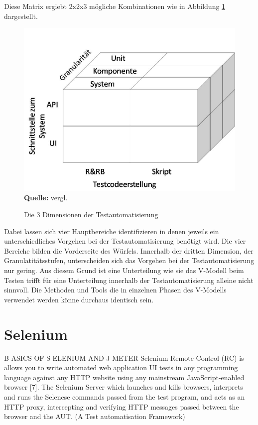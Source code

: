Diese Matrix ergiebt 2x2x3 mögliche Kombinationen wie in Abbildung \ref{fig:3DimensionenDerTestauto} dargestellt.

\begin{figure}[htb]
  \centering  
  \includegraphics[scale=0.5]{img/methodenTestauto.jpg}\\
  \footnotesize\sffamily\textbf{Quelle:} vergl. \cite{meszaros_agile_2003}
  \caption{Die 3 Dimensionen der Testautomatisierung}
  \label{fig:3DimensionenDerTestauto}
\end{figure}

Dabei lassen sich vier Hauptbereiche identifizieren in denen jeweils ein unterschiedliches Vorgehen bei der Testautomatisierung benötigt wird. Die vier Bereiche bilden die Vorderseite des Würfels. Innerhalb der dritten Dimension, der Granulatitätsstufen, unterscheiden sich das Vorgehen bei der Testautomatisierung nur gering. Aus diesem Grund ist eine Unterteilung wie sie das V-Modell beim Testen trifft für eine Unterteilung innerhalb der Testautomatisierung alleine nicht sinnvoll. Die Methoden und Tools die in einzelnen Phasen des V-Modells verwendet werden könne durchaus identisch sein.



\section{Selenium}
\label{sec:selenium}

B
ASICS OF
S
ELENIUM AND
J
METER
Selenium Remote Control (RC) is allows you to write
automated web application UI tests in any programming
language against any HTTP website using any mainstream
JavaScript-enabled browser [7].
The Selenium Server which launches and kills browsers,
interprets and runs the Selenese commands passed from the
test program, and acts as an HTTP proxy, intercepting and
verifying HTTP messages passed between the browser and
the AUT. (A Test automatisation Framework)